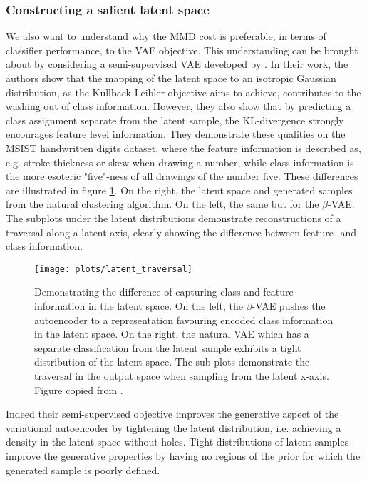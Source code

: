 \subsubsection{Constructing a salient latent space}

We also want to understand why the MMD cost is preferable, in terms of classifier performance, to the VAE objective. This understanding can be brought about by considering a semi-supervised VAE developed by \citet{Antoran2019}. In their work, the authors show that the mapping of the latent space to an isotropic Gaussian distribution, as the Kullback-Leibler objective aims to achieve, contributes to the washing out of class information. However, they also show that by predicting a class assignment separate from the latent sample, the KL-divergence strongly encourages feature level information. They demonstrate these qualities on the MSIST handwritten digits dataset, where the feature information is described as, e.g. stroke thickness or skew when drawing a number, while class information is the more esoteric "five"-ness of all drawings of the number five. These differences are illustrated in figure \ref{fig:latent_traversal}. On the right, the latent space and generated samples from the natural clustering algorithm. On the left, the same but for the $\beta$-VAE. The subplots under the latent distributions demonstrate reconstructions of a traversal along a latent axis, clearly showing the difference between feature- and class information. 



\begin{figure}
\centering
\texttt{[image: plots/latent\_traversal]}
\caption[Difference between generative and discriminative latent spaces]{Demonstrating the difference of capturing class and feature information in the latent space. On the left, the $\beta$-VAE pushes the autoencoder to a representation favouring encoded class information in the latent space. On the right, the natural VAE which has a separate classification from the latent sample exhibits a tight distribution of the latent space. The sub-plots demonstrate the traversal in the output space when sampling from the latent x-axis. Figure copied from \citet{Antoran2019}.}\label{fig:latent_traversal}
\end{figure}

Indeed their semi-supervised objective improves the generative aspect of the variational autoencoder by tightening the latent distribution, i.e. achieving a density in the latent space without holes. Tight distributions of latent samples improve the generative properties by having no regions of the prior for which the generated sample is poorly defined. 

